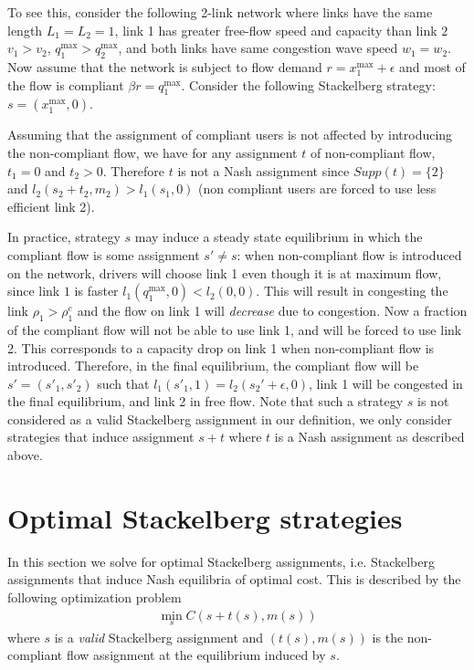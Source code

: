 To see this, consider the following 2-link network where links have the same length $L_1 = L_2 = 1$, link 1 has greater free-flow speed and capacity than link $2$ $v_1 > v_2$, $q_1^{\max} > q_2^{\max}$, and both links have same congestion wave speed $w_1 = w_2$.
Now assume that the network is subject to flow demand $r = x_1^{\max} + \epsilon$ and most of the flow is compliant $\beta r = q_1^{\max}$. Consider the following Stackelberg strategy: $s = (x_1^{\max}, 0)$.

Assuming that the assignment of compliant users is not affected by introducing the non-compliant flow, we have for any assignment $t$ of non-compliant flow, $t_1 = 0$ and $t_2 > 0$. Therefore $t$ is not a Nash assignment since $Supp(t) = \{ 2 \}$ and $l_2(s_2 + t_2, m_2) > l_1(s_1, 0)$ (non compliant users are forced to use less efficient link 2).

In practice, strategy $s$ may induce a steady state equilibrium in which the compliant flow is some assignment $s' \neq s$: when non-compliant flow is introduced on the network, drivers will choose link 1 even though it is at maximum flow, since link $1$ is faster $l_1(q_1^{\max}, 0) < l_2(0, 0)$. This will result in congesting the link $\rho_1 > \rho_1^c$ and the flow on link 1 will \emph{decrease} due to congestion. Now a fraction of the compliant flow will not be able to use link 1, and will be forced to use link 2. This corresponds to a capacity drop on link 1 when non-compliant flow is introduced. Therefore, in the final equilibrium, the compliant flow will be $s' = (s'_1, s'_2)$ such that $l_1(s'_1, 1) = l_2(s_2' + \epsilon, 0)$, link 1 will be congested in the final equilibrium, and link 2 in free flow. Note that such a strategy $s$ is not considered as a valid Stackelberg assignment in our definition, we only consider strategies that induce assignment $s + t$ where $t$ is a Nash assignment as described above.









\section{Optimal Stackelberg strategies}

In this section we solve for optimal Stackelberg assignments, i.e. Stackelberg assignments that induce Nash equilibria of optimal cost. This is described by the following optimization problem
\begin{align*}
\min_s C\left( s + t(s), m(s) \right)
\end{align*}
where $s$ is a \emph{valid} Stackelberg assignment and $(t(s), m(s))$ is the non-compliant flow assignment at the equilibrium induced by $s$.

